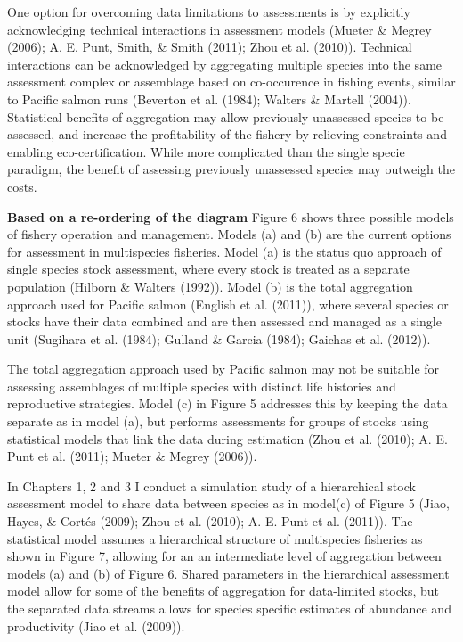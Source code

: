 \documentclass[12pt,]{scrartcl}
\begin{document}
One option for overcoming data limitations to assessments is by
explicitly acknowledging technical interactions in assessment models
(Mueter \& Megrey (2006); A. E. Punt, Smith, \& Smith (2011); Zhou et
al. (2010)). Technical interactions can be acknowledged by aggregating
multiple species into the same assessment complex or assemblage based on
co-occurence in fishing events, similar to Pacific salmon runs (Beverton
et al. (1984); Walters \& Martell (2004)). Statistical benefits of
aggregation may allow previously unassessed species to be assessed, and
increase the profitability of the fishery by relieving constraints and
enabling eco-certification. While more complicated than the single
specie paradigm, the benefit of assessing previously unassessed species
may outweigh the costs.

\textbf{Based on a re-ordering of the diagram} Figure 6 shows three
possible models of fishery operation and management. Models (a) and (b)
are the current options for assessment in multispecies fisheries. Model
(a) is the status quo approach of single species stock assessment, where
every stock is treated as a separate population (Hilborn \& Walters
(1992)). Model (b) is the total aggregation approach used for Pacific
salmon (English et al. (2011)), where several species or stocks have
their data combined and are then assessed and managed as a single unit
(Sugihara et al. (1984); Gulland \& Garcia (1984); Gaichas et al.
(2012)).

The total aggregation approach used by Pacific salmon may not be
suitable for assessing assemblages of multiple species with distinct
life histories and reproductive strategies. Model (c) in Figure 5
addresses this by keeping the data separate as in model (a), but
performs assessments for groups of stocks using statistical models that
link the data during estimation (Zhou et al. (2010); A. E. Punt et al.
(2011); Mueter \& Megrey (2006)).

In Chapters 1, 2 and 3 I conduct a simulation study of a hierarchical
stock assessment model to share data between species as in model(c) of
Figure 5 (Jiao, Hayes, \& Cortés (2009); Zhou et al. (2010); A. E. Punt
et al. (2011)). The statistical model assumes a hierarchical structure
of multispecies fisheries as shown in Figure 7, allowing for an an
intermediate level of aggregation between models (a) and (b) of Figure
6. Shared parameters in the hierarchical assessment model allow for some
of the benefits of aggregation for data-limited stocks, but the
separated data streams allows for species specific estimates of
abundance and productivity (Jiao et al. (2009)).
\end{document}
